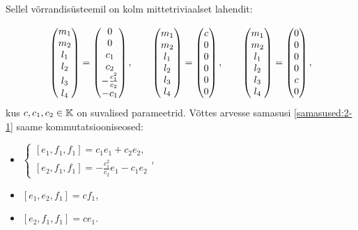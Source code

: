 Sellel võrrandisüsteemil on kolm mittetriviaalset lahendit:

\begin{align*}
    \begin{pmatrix}
        m_1 \\ m_2 \\ l_1 \\ l_2 \\ l_3 \vphantom{-\frac{c_1^2}{c_2}} \\ l_4
    \end{pmatrix} = 
    \begin{pmatrix}
        0 \\ 0 \\ c_1 \\ c_2 \\ -\frac{c_1^2}{c_2} \\ -c_1
    \end{pmatrix},
    \quad\quad
    \begin{pmatrix}
        m_1 \\ m_2 \\ l_1 \\ l_2 \\ l_3 \\ l_4
    \end{pmatrix} = 
    \begin{pmatrix}
        c \\ 0 \\ 0 \\ 0 \\ 0 \\ 0
    \end{pmatrix},
    \quad\quad
    \begin{pmatrix}
        m_1 \\ m_2 \\ l_1 \\ l_2 \\ l_3 \\ l_4
    \end{pmatrix} = 
    \begin{pmatrix}
        0 \\ 0 \\ 0 \\ 0 \\ c \\ 0
    \end{pmatrix},
\end{align*}
kus $c, c_1, c_2 \in \mathbb{K}$ on suvalised parameetrid.
Võttes arvesse samasusi \eqref{samasused:2-1} saame kommutatsiooniseosed:
\begin{itemize}
    \item $\begin{cases}
              \left[ e_1, f_1, f_1 \right] = c_1 e_1 + c_2 e_2,\\
              \left[ e_2, f_1, f_1 \right] = -\frac{c_1^2}{c_2} e_1 - c_1 e_2
          \end{cases}$,
    \item $\left[ e_1, e_2, f_1 \right] = c f_1$,
    \item $\left[ e_2, f_1, f_1 \right] = c e_1$.
\end{itemize}